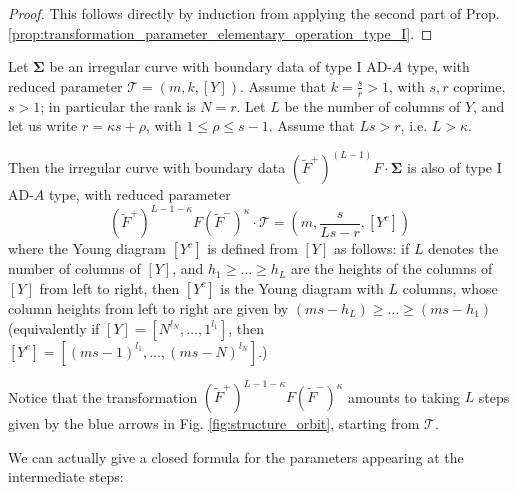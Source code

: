 \documentclass[11pt,a4paper]{amsart}
\numberwithin{equation}{section}
\begin{document}
\begin{proof}
This follows directly by induction from applying the second part of Prop. \ref{prop:transformation_parameter_elementary_operation_type_I}. 
\end{proof}

\begin{proposition}
\label{prop:duality_II_complement_diagram}
Let $\bm\Sigma$ be an irregular curve with boundary data of type I AD-$A$ type, with reduced parameter $\mathscr T=(m,k,[Y])$.
Assume that $k=\frac{s}{r}>1$, with $s, r$ coprime, $s>1$; in particular the rank is $N=r$. Let $L$ be the number of columns of $Y$, and let us write $r=\kappa s +\rho$, with $1\leq \rho\leq s-1$. Assume that $Ls>r$, i.e. $L>\kappa$.

Then the irregular curve with boundary data  $(\widetilde{F}^+)^{(L-1)}F\cdot\bm\Sigma
$ is also of type I AD-$A$ type, with reduced parameter
\begin{equation}
\label{eq:duality_complement_diagram}
(\widetilde{F}^+)^{L-1-\kappa} F (\widetilde{F}^-)^{\kappa} \cdot\mathcal T=\left(m, \frac{s}{Ls-r}, [Y^c]\right)
\end{equation}
where the Young diagram $[Y^c]$ is defined from $[Y]$ as follows: if $L$ denotes the number of columns of $[Y]$, and $h_1\geq \dots\geq h_L$ are the heights of the columns of $[Y]$ from left to right, then $[Y^c]$ is the Young diagram with $L$ columns, whose column heights from left to right are given by $(ms-h_L)\geq \dots \geq (ms-h_1)$ (equivalently if $[Y]=[N^{l_N}, \dots, 1^{l_1}]$, then
$[Y^c]=[(ms-1)^{l_1}, \dots, (ms-N)^{l_N}]$.)
\end{proposition}

Notice that the transformation $(\widetilde{F}^+)^{L-1-\kappa} F (\widetilde{F}^-)^\kappa$ amounts to taking $L$ steps given by the blue arrows in Fig. \ref{fig:structure_orbit}, starting from $\mathcal T$.


We can actually give a closed formula for the parameters appearing at the intermediate steps:
\end{document}
